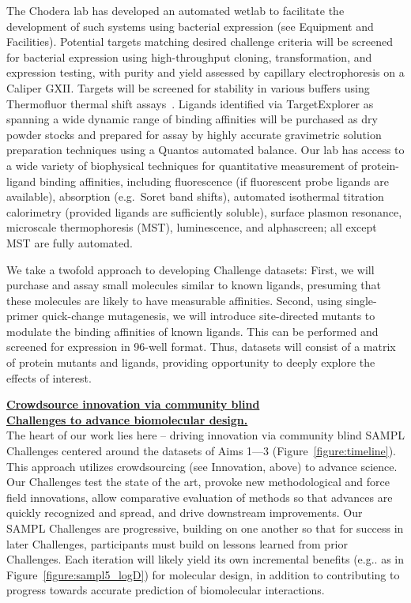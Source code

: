 \documentclass[11pt]{article}
\begin{document}
The Chodera lab has developed an automated wetlab to facilitate the development of such systems using bacterial expression (see Equipment and Facilities).
Potential targets matching desired challenge criteria will be screened for bacterial expression using high-throughput cloning, transformation, and expression testing, with purity and yield assessed by capillary electrophoresis on a Caliper GXII.
Targets will be screened for stability in various buffers using Thermofluor thermal shift assays~\cite{Reinhard:2013:ActaCrystallographicaSectionFStructuralBiologyandCrystallizationCommunications}.
Ligands identified via TargetExplorer as spanning a wide dynamic range of binding affinities will be purchased as dry powder stocks and prepared for assay by highly accurate gravimetric solution preparation techniques using a Quantos automated balance.
Our lab has access to a wide variety of biophysical techniques for quantitative measurement of protein-ligand binding affinities, including fluorescence (if fluorescent probe ligands are available), absorption (e.g.~Soret band shifts), automated isothermal titration calorimetry (provided ligands are sufficiently soluble), surface plasmon resonance, microscale thermophoresis (MST), luminescence, and alphascreen; all except MST are fully automated. 

We take a twofold approach to developing Challenge datasets:
First, we will purchase and assay small molecules similar to known ligands, presuming that these molecules are likely to have measurable affinities.
Second, using single-primer quick-change mutagenesis, we will introduce site-directed mutants to modulate the binding affinities of known ligands.
This can be performed and screened for expression in 96-well format.
Thus, datasets will consist of a matrix of protein mutants and ligands, providing opportunity to deeply explore the effects of interest.

\textbf{\underline{Crowdsource innovation via community blind}}\\
\textbf{\underline{Challenges to advance biomolecular design.}}\\
The heart of our work lies here -- driving innovation via community blind SAMPL Challenges centered around the datasets of Aims 1---3 (Figure~\ref{figure:timeline}).
This approach utilizes crowdsourcing (see Innovation, above) to advance science.
Our Challenges test the state of the art, provoke new methodological and force field innovations, allow comparative evaluation of methods so that advances are quickly recognized and spread, and drive downstream improvements.
Our SAMPL Challenges are progressive, building on one another so that for success in later Challenges, participants must build on lessons learned from prior Challenges.
Each iteration will likely yield its own incremental benefits (e.g.. as in Figure~\ref{figure:sampl5_logD}) for molecular design, in addition to contributing to progress towards accurate prediction of biomolecular interactions.
\end{document}
